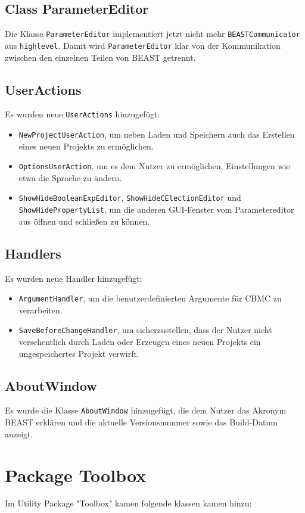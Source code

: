 \documentclass[a4paper]{scrreprt}
\begin{document}
\subsection{Class ParameterEditor}
Die Klasse \verb!ParameterEditor! implementiert jetzt nicht mehr \verb!BEASTCommunicator! aus \verb!highlevel!. Damit wird \verb!ParameterEditor! klar von der Kommunikation zwischen den einzelnen Teilen von BEAST getrennt. \\

\subsection{UserActions}
Es wurden neue \verb!UserActions! hinzugefügt:
\begin{itemize}
\item \verb!NewProjectUserAction!, um neben Laden und Speichern auch das Erstellen eines neuen Projekts zu ermöglichen.
\item \verb!OptionsUserAction!, um es dem Nutzer zu ermöglichen, Einstellungen wie etwa die Sprache zu ändern.
\item \verb!ShowHideBooleanExpEditor!, \verb!ShowHideCElectionEditor! und \verb!ShowHidePropertyList!, um die anderen GUI-Fenster vom Parametereditor aus öffnen und schließen zu können.
\end{itemize}

\subsection{Handlers}
Es wurden neue Handler hinzugefügt:
\begin{itemize}
\item \verb!ArgumentHandler!, um die benutzerdefinierten Argumente für CBMC zu verarbeiten.
\item \verb!SaveBeforeChangeHandler!, um sicherzustellen, dass der Nutzer nicht versehentlich durch Laden oder Erzeugen eines neuen Projekts ein ungespeichertes Projekt verwirft.
\end{itemize}

\subsection{AboutWindow}
Es wurde die Klasse \verb!AboutWindow! hinzugefügt, die dem Nutzer das Akronym BEAST erklären und die aktuelle Versionsnummer sowie das Build-Datum anzeigt.

\section{Package Toolbox}
Im Utility Package "Toolbox" kamen folgende klassen kamen hinzu:\\
\end{document}

